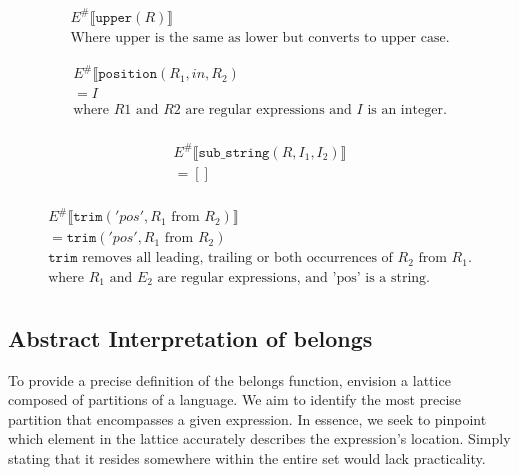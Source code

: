 \begin{align*}
    E^\# \llbracket \texttt{upper}(R) \rrbracket \\
    \text{Where upper is the same as lower but converts to upper case.}
\end{align*}

\begin{align*}
    E^\# \llbracket \texttt{position}(R_1, in, R_2) \\
    = I                                             \\
    \text{where } R1 \text{ and } R2 \text{ are regular expressions and }
    I \text{ is an integer.}                        \\
\end{align*}

\begin{align*}
    E^\# \llbracket \texttt{sub\_string} (R, I_1, I_2) \rrbracket \\
    = []                                                          \\
\end{align*}

\begin{align*}
    E^\# \llbracket \texttt{trim} ('pos', R_1 \text{ from } R_2) \rrbracket                            \\
    =  \texttt{trim}('pos', R_1 \text{ from } R_2)                                                     \\
    \texttt{trim} \text{ removes all leading, trailing or both occurrences of } R_2 \text{ from } R_1. \\
    \text{where } R_1 \text{ and } E_2 \text{ are regular expressions, and 'pos' is a string.}         \\
\end{align*}


\subsection{Abstract Interpretation of belongs}
To provide a precise definition of the belongs function, envision a lattice composed of partitions of a language. We aim to identify the most precise partition that encompasses a given expression. In essence, we seek to pinpoint which element in the lattice accurately describes the expression's location. Simply stating that it resides somewhere within the entire set would lack practicality.

